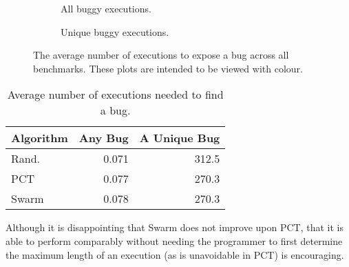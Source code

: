 \begin{figure}
  \centering
  \begin{subfigure}{0.49\textwidth}
    \centering
    \resizebox{\textwidth}{!}{}
    \caption{All buggy executions.}\label{fig:freqbugs-total}
  \end{subfigure}
  \begin{subfigure}{0.49\textwidth}
    \centering
    \resizebox{\textwidth}{!}{}
    \caption{Unique buggy executions.}\label{fig:freqbugs-unique}
  \end{subfigure}
  \caption[Plot of average number of executions needed to expose a bug.]{The average number of executions to expose a bug across all benchmarks.  These plots are intended to be viewed with colour.}\label{fig:freqbugs}
\end{figure}

\begin{table}
  \centering
  \begin{tabular}{lrr} \toprule
    Algorithm & Any Bug & A Unique Bug \\ \midrule
    Rand. & 0.071 & 312.5 \\
    PCT   & 0.077 & 270.3 \\
    Swarm & 0.078 & 270.3 \\ \bottomrule
  \end{tabular}
  \caption{Average number of executions needed to find a bug.}\label{tbl:freqs}
\end{table}

Although it is disappointing that Swarm does not improve upon PCT, that it is
able to perform comparably without needing the programmer to first determine the
maximum length of an execution (as is unavoidable in PCT) is encouraging.
